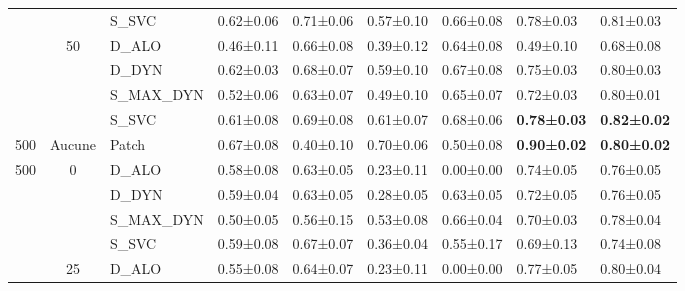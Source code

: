 \begin{landscape}
\begin{table}[H]
\begin{tabular}{cclllllll}
							        &                                   & S\_SVC                    & 0.62±0.06         & 0.71±0.06     & 0.57±0.10         & 0.66±0.08     & 0.78±0.03         & 0.81±0.03         \\ \cline{2-9}
							        & \multirow{4}{*}{50}               & D\_ALO                    & 0.46±0.11         & 0.66±0.08     & 0.39±0.12         & 0.64±0.08     & 0.49±0.10         & 0.68±0.08         \\
							        &                                   & D\_DYN                    & 0.62±0.03         & 0.68±0.07     & 0.59±0.10         & 0.67±0.08     & 0.75±0.03         & 0.80±0.03         \\
							        &                                   & S\_MAX\_DYN               & 0.52±0.06         & 0.63±0.07     & 0.49±0.10         & 0.65±0.07     & 0.72±0.03         & 0.80±0.01         \\ 
		                            &                                   & S\_SVC                    & 0.61±0.08         & 0.69±0.08     & 0.61±0.07         & 0.68±0.06     & \textbf{0.78±0.03}& \textbf{0.82±0.02}\\ \midrule
		500                         & Aucune                            & Patch                     & 0.67±0.08         & 0.40±0.10     & 0.70±0.06         & 0.50±0.08     & \textbf{0.90±0.02}& \textbf{0.80±0.02}\\ \midrule
		\multirow{12}{*}{500}       & \multirow{4}{*}{0}                & D\_ALO                    & 0.58±0.08         & 0.63±0.05     & 0.23±0.11         & 0.00±0.00     & 0.74±0.05         & 0.76±0.05         \\
							        &                                   & D\_DYN                    & 0.59±0.04         & 0.63±0.05     & 0.28±0.05         & 0.63±0.05     & 0.72±0.05         & 0.76±0.05         \\
							        &                                   & S\_MAX\_DYN               & 0.50±0.05         & 0.56±0.15     & 0.53±0.08         & 0.66±0.04     & 0.70±0.03         & 0.78±0.04         \\
							        &                                   & S\_SVC                    & 0.59±0.08         & 0.67±0.07     & 0.36±0.04         & 0.55±0.17     & 0.69±0.13         & 0.74±0.08         \\ \cline{2-9}
							        & \multirow{4}{*}{25}               & D\_ALO                    & 0.55±0.08         & 0.64±0.07     & 0.23±0.11         & 0.00±0.00     & 0.77±0.05         & 0.80±0.04         \\

\end{tabular}
\end{table}
\end{landscape}
